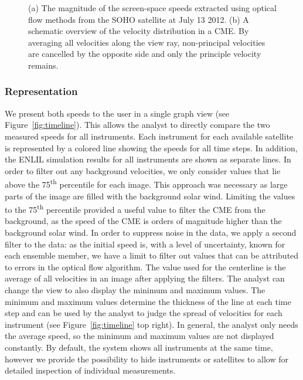 \documentclass[journal]{vgtc}                %
\begin{document}
\begin{figure}
{  \label{fig:simulationvelocitygathering}
}
\caption{(a) The magnitude of the screen-space speeds extracted using optical flow methods from the SOHO satellite at July 13 2012. (b) A schematic overview of the velocity distribution in a CME. By averaging all velocities along the view ray, non-principal velocities are cancelled by the opposite side and only the principle velocity remains.}
\end{figure}



\subsubsection{Representation} \label{sec:representation}
We present both speeds to the user in a single graph view (see Figure~\ref{fig:timeline}). This allows the analyst to directly compare the two measured speeds for all instruments. Each instrument for each available satellite is represented by a colored line showing the speeds for all time steps. In addition, the ENLIL simulation results for all instruments are shown as separate lines. In order to filter out any background velocities, we only consider values that lie above the 75\textsuperscript{th} percentile for each image. This approach was necessary as large parts of the image are filled with the background solar wind. Limiting the values to the 75\textsuperscript{th} percentile provided a useful value to filter the CME from the background, as the speed of the CME is orders of magnitude higher than the background solar wind. In order to suppress noise in the data, we apply a second filter to the data: as the initial speed is, with a level of uncertainty, known for each ensemble member, we have a limit to filter out values that can be attributed to errors in the optical flow algorithm. The value used for the centerline is the average of all velocities in an image after applying the filters. The analyst can change the view to also display the minimum and maximum values. The minimum and maximum values determine the thickness of the line at each time step and can be used by the analyst to judge the spread of velocities for each instrument (see Figure~\ref{fig:timeline} top right). In general, the analyst only needs the average speed, so the minimum and maximum values are not displayed constantly. By default, the system shows all instruments at the same time, however we provide the possibility to hide instruments or satellites to allow for detailed inspection of individual measurements.
\end{document}
